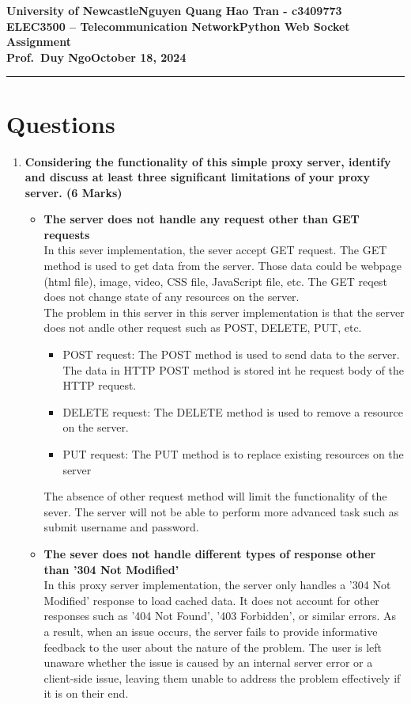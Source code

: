 \documentclass[11pt]{article}
\newcommand{\myname}{Nguyen Quang Hao Tran - c3409773}
\newcommand{\assignment}{Python Web Socket Assignment}
\newcommand{\duedate}{October 18, 2024}
\begin{document}
	
	\textbf{University of Newcastle}\hfill\textbf{\myname}\\[0.01in]
	\textbf{ELEC3500 -- Telecommunication Network}\hfill\textbf{\assignment}\\[0.01in]
	\textbf{Prof.\ Duy Ngo}\hfill\textbf{\duedate}\\
	\smallskip\hrule\bigskip
	
	\section{Questions}
	\begin{enumerate}
		\item \textbf{Considering the functionality of this simple proxy server, identify and discuss at least three significant limitations of your proxy server. (6 Marks)}
			\begin{itemize}
				\item \textbf{The server does not handle any request other than GET requests}\\
				In this sever implementation, the sever accept GET request. The GET method is used to get data from the server. Those data could be webpage (html file), image, video, CSS file, JavaScript file, etc. The GET reqest does not change state of any resources on the server.\\
				The problem in this server in this server implementation is that the server does not andle other request such as POST, DELETE, PUT, etc.
					\begin{itemize}
						\item POST request: The POST method is used to send data to the server. The data in HTTP POST method is stored int he request body of the HTTP request.
						\item DELETE request: The DELETE method is used to remove a resource on the server.
						\item PUT request: The PUT method is to replace existing resources on the server
					\end{itemize}
				The absence of other request method will limit the functionality of the sever. The server will not be able to perform more advanced task such as submit username and password.\\
				
				\item \textbf{The sever does not handle different types of response other than '304 Not Modified'}\\
				In this proxy server implementation, the server only handles a '304 Not Modified' response to load cached data. It does not account for other responses such as '404 Not Found', '403 Forbidden', or similar errors. As a result, when an issue occurs, the server fails to provide informative feedback to the user about the nature of the problem. The user is left unaware whether the issue is caused by an internal server error or a client-side issue, leaving them unable to address the problem effectively if it is on their end.\\
				

\end{itemize}
\end{enumerate}
\end{document}

